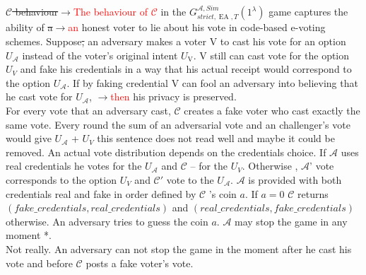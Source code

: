 \documentclass[12pt]{article}
\newcommand{\fix}[2]{\sout{#1}$\rightarrow$\textcolor{red}{#2}}
\DeclareMathOperator{\ea}{EA}
\begin{document}
\fix{$\mathcal{C}$  behaviour}{The behaviour of $\mathcal{C}$} in the  $G_{strict,\ea,T}^{\mathcal{A}, Sim}(1^{\lambda})$ game captures the ability of \fix{a}{an} honest voter to lie about his vote in code-based e-voting schemes. Suppose\sout{,} an adversary  makes a voter V to cast his vote for an option $U_{\mathcal{A}}$ instead of the voter's original intent $U_{\mathrm{V}}$.  V still can cast vote for the option $U_{V}$ and fake his credentials in a way that his actual receipt would correspond to the option $U_{\mathcal{A}}$. If by faking credential V can fool an adversary into believing that he cast vote for $U_{\mathcal{A}}$, \fix{}{then} his privacy is preserved. \\

For every vote that an adversary cast, $\mathcal{C}$ creates a fake voter who cast exactly the same vote. Every round the sum of an adversarial vote and an challenger's vote would give $U_{\mathcal{A}}$ + $U_{V}${\color{red} this sentence does not read well and maybe it could be removed}. An actual vote distribution depends on the credentials choice. If $\mathcal{A}$ uses real credentials he votes for the $U_{\mathcal{A}}$ and  $\mathcal{C}$ --  for the $U_{V}$. Otherwise , $\mathcal{A}$' vote corresponds to  the  option $U_{V}$  and  $\mathcal{C}'$ vote to the $U_{\mathcal{A}}$. $\mathcal{A}$ is provided with both credentials real and fake in order defined by $\mathcal{C}$ 's coin $a$. If $a=0$ $\mathcal{C}$  returns $(fake\_credentials,real\_credentials)$ and $(real\_credentials,fake\_credentials)$ otherwise. An adversary tries to guess the coin $a$. $\mathcal{A}$ may stop the game in any moment  {\color{red}*}. \\
{\color{red} Not really. An adversary can not stop the game in the moment after he cast his vote and before $\mathcal{C}$ posts a fake voter's vote.}
\end{document}
